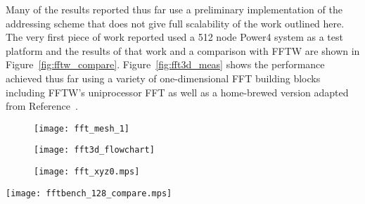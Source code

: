\documentclass[pdftex,finalversion,simpleeqnnos,titlepage,12pt]{article}
\begin{document}
Many of the results reported thus far use a preliminary implementation
of the addressing scheme that does not give full scalability of the
work outlined here. The very first piece of work reported used a 512
node Power4 system as a test platform and the results of that work and
a comparison with FFTW\cite{FFTW98} are shown in
Figure~\ref{fig:fftw_compare}.  Figure~\ref{fig:fft3d_meas} shows the
performance achieved thus far using a variety of one-dimensional FFT
building blocks including FFTW's uniprocessor FFT as well as a
home-brewed version adapted from Reference~\cite{press:93}.


\begin{figure}[p]
\begin{center}
\texttt{[image: fft\_mesh\_1]}
\end{center}
\caption{}
\label{fig:vol_decomp}
\end{figure}

\begin{figure}[p]
\begin{center}
\texttt{[image: fft3d\_flowchart]}
\end{center}
\caption{}
\label{fig:fft_flowchart}
\end{figure}

\begin{figure}[p]
\begin{center}
\texttt{[image: fft\_xyz0.mps]}
\end{center}
\caption{}
\label{fig:fft_dflow}
\end{figure}



\begin{sidewaysfigure}[p]
\texttt{[image: fftbench\_128\_compare.mps]}
\caption{}
\label{fig:fftw_compare}
\end{sidewaysfigure}
\end{document}
